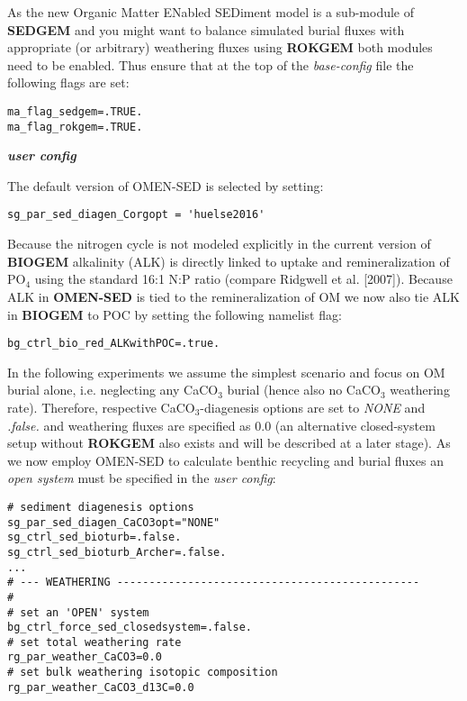 \documentclass[11pt,fleqn]{book} %
\begin{document}
\noindent As the new Organic Matter ENabled SEDiment model is a sub-module of \textbf{SEDGEM} and you might want to balance simulated burial fluxes with appropriate (or arbitrary) weathering fluxes using \textbf{ROKGEM} both modules need to be enabled. 
Thus ensure that at the top of the \textit{base-config} file the following flags are set:
\vspace{-1mm}\small\begin{verbatim}
ma_flag_sedgem=.TRUE.
ma_flag_rokgem=.TRUE.
\end{verbatim}\normalsize\vspace{-1mm}

\noindent \textbf{\textit{user config}}
\vspace{1mm}

\noindent The default version of OMEN-SED is selected by setting:
\vspace{-1mm}\begin{verbatim}
sg_par_sed_diagen_Corgopt = 'huelse2016'
\end{verbatim}\vspace{-1mm}
Because the nitrogen cycle is not modeled explicitly in the current version of \textbf{BIOGEM} alkalinity (ALK) is directly linked to uptake and remineralization of PO$_4$ using the standard 16:1 N:P ratio (compare Ridgwell et al. [2007]). 
Because ALK in \textbf{OMEN-SED} is tied to the remineralization of OM we now also tie ALK in \textbf{BIOGEM} to POC by setting the following namelist flag:
\vspace{-1mm}\begin{verbatim}
bg_ctrl_bio_red_ALKwithPOC=.true.
\end{verbatim}\vspace{-1mm}
In the following experiments we assume the simplest scenario and focus on OM burial alone, i.e. neglecting any CaCO$_3$ burial (hence also no CaCO$_3$ weathering rate). Therefore, respective CaCO$_3$-diagenesis options are set to \textit{NONE} and \textit{.false.} and weathering fluxes are specified as 0.0 (an alternative closed-system setup without \textbf{ROKGEM} also exists and will be described at a later stage). 
As we now employ OMEN-SED to calculate benthic recycling and burial fluxes an \textit{open system} must be specified in the \textit{user config}:
\vspace{-1mm}\begin{verbatim}
# sediment diagenesis options
sg_par_sed_diagen_CaCO3opt="NONE"
sg_ctrl_sed_bioturb=.false.
sg_ctrl_sed_bioturb_Archer=.false.
...
# --- WEATHERING -----------------------------------------------
#
# set an 'OPEN' system
bg_ctrl_force_sed_closedsystem=.false.
# set total weathering rate
rg_par_weather_CaCO3=0.0
# set bulk weathering isotopic composition
rg_par_weather_CaCO3_d13C=0.0
\end{verbatim}\vspace{-1mm}
\end{document}
